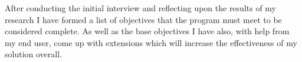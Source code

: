 \begin{FlushLeft}
        
        
        After conducting the initial interview and reflecting upon the results of my research I have formed a list of objectives that the program must meet to be considered 
        complete. As well as the base objectives I have also, with help from my end user, come up with extensions which will increase the effectiveness of my solution overall. \\
        \bk
        
        \renewcommand{\labelenumii}{\arabic{enumi}.\arabic{enumii}}
        \renewcommand{\labelenumiii}{\arabic{enumi}.\arabic{enumii}.\arabic{enumiii}}
        \renewcommand{\labelenumiv}{\arabic{enumi}.\arabic{enumii}.\arabic{enumiii}.\arabic{enumiv}}
        

\end{FlushLeft}
